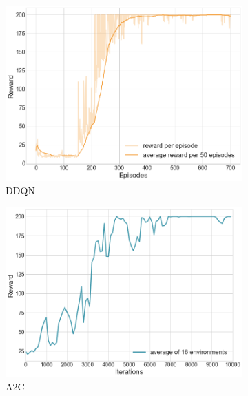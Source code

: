 \begin{figure}[H]
    \centering
    \begin{subfigure}[b]{0.48\textwidth}
        \centering
        \includegraphics[width=\textwidth]{Figures/ddqnCart.png}
        \caption{\gls{DDQN}}
        \label{ddqnCart}
    \end{subfigure}
    \begin{subfigure}[b]{0.48\textwidth}
        \centering
        \includegraphics[width=\textwidth]{Figures/a2cCart.png}
        \caption{\gls{A2C}}
        \label{a2cCart}
    \end{subfigure}
    \hfill
    \begin{subfigure}[b]{0.48\textwidth}
        \centering

\end{subfigure}
\end{figure}
